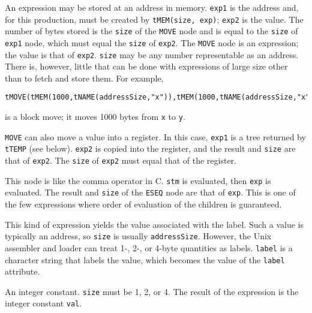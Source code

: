 \begin{production}
An expression may be stored at an address in memory.
\verb|exp1| is the address and, for this production,
must be created by \verb|tMEM(size, exp)|; \verb|exp2| is the value.
The number of bytes stored is the \verb|size| of the \verb|MOVE| node and
is equal to the \verb|size| of \verb|exp1| node,
which must equal the \verb|size| of \verb|exp2|.
The \verb|MOVE| node is an expression; the value is that of \verb|exp2|.
\verb|size| may be any number representable as an address.
There is, however, little that can be done
with expressions of large size other than to fetch and store them.
For example,
\begin{verbatim}
tMOVE(tMEM(1000,tNAME(addressSize,"x")),tMEM(1000,tNAME(addressSize,"x")))
\end{verbatim}
is a block move; it moves 1000 bytes from \verb|x| to \verb|y|.


\verb|MOVE| can also move a value into a register.
In this case, \verb|exp1| is a tree returned by \verb|tTEMP| (see below).
\verb|exp2| is copied into the register, and the result and \verb|size|
are that of \verb|exp2|.
The \verb|size| of \verb|exp2| must equal that of the register.


This node is like the comma operator in C.
\verb|stm| is evaluated, then \verb|exp| is evaluated.
The result and \verb|size| of the \verb|ESEQ| node are that of \verb|exp|.
This is one of the few expressions where order of
evaluation of the children is guaranteed.


This kind of expression yields the value associated with the label.
Such a value is typically an address, so \verb|size| is usually \verb|addressSize|.
However, the {\sc Unix} assembler and loader can treat 1-, 2-, or 4-byte
quantities as labels.
\verb|label| is a character string that labels the value, which becomes
the value of the \verb|label| attribute.


An integer constant. \verb|size| must be 1, 2, or 4.
The result of the expression is the integer constant \verb|val|.



\end{production}
